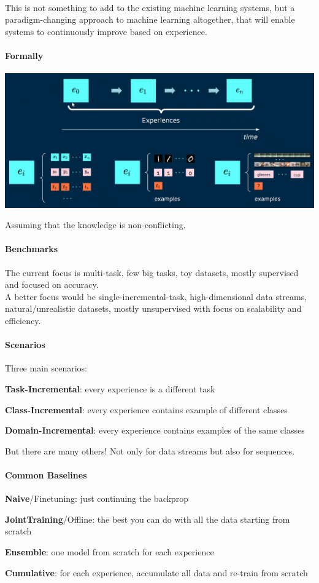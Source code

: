 \documentclass[10pt]{report}
\begin{document}
\paragraph{} This is not something to add to the existing machine learning systems, but a paradigm-changing approach to machine learning altogether, that will enable systems to continuously improve based on experience.
\paragraph{Formally}
\begin{center}
	\includegraphics[scale=0.5]{157.png}
\end{center}
Assuming that the knowledge is non-conflicting.
\paragraph{Benchmarks} The current focus is multi-task, few big tasks, toy datasets, mostly supervised and focused on accuracy.\\
A better focus would be single-incremental-task, high-dimensional data streams, natural/unrealistic datasets, mostly unsupervised with focus on scalability and efficiency.
\paragraph{Scenarios} Three main scenarios:
\begin{list}{}{}
	\item \textbf{Task-Incremental}: every experience is a different task
	\item \textbf{Class-Incremental}: every experience contains example of different classes
	\item \textbf{Domain-Incremental}: every experience contains examples of the same classes
\end{list}
But there are many others! Not only for data streams but also for sequences.
\paragraph{Common Baselines}\begin{list}{}{}
	\item \textbf{Naive}/Finetuning: just continuing the backprop
	\item \textbf{JointTraining}/Offline: the best you can do with all the data starting from scratch
	\item \textbf{Ensemble}: one model from scratch for each experience
	\item \textbf{Cumulative}: for each experience, accumulate all data and re-train from scratch
\end{list}
\end{document}
